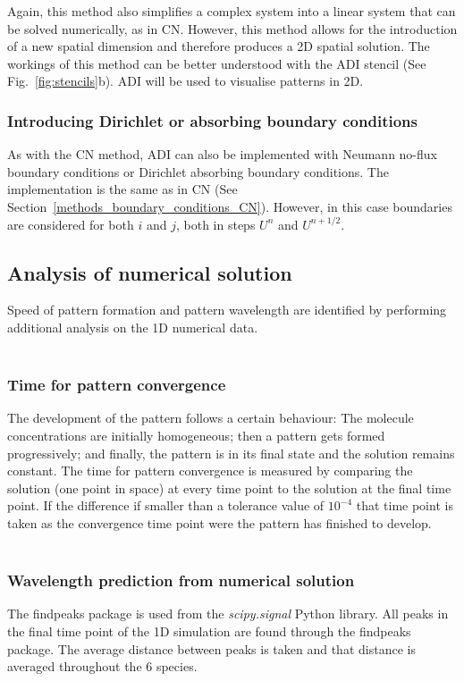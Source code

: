 Again, this method also simplifies a complex system into a linear system that can be solved numerically, as in \acrshort{CN}. However, this method allows for the introduction of a new spatial dimension and therefore produces a 2D spatial solution. The workings of this method can be better understood with the \acrshort{ADI} stencil (See Fig.~\ref{fig:stencils}b). \acrshort{ADI} will be used to visualise patterns in 2D.


\subsubsection{Introducing Dirichlet or absorbing boundary conditions}\label{methods_boundary_conditions_ADI}
As with the CN method, ADI can also be implemented with Neumann no-flux boundary conditions or Dirichlet absorbing boundary conditions.
The implementation is the same as in CN (See Section~\ref{methods_boundary_conditions_CN}).
However, in this case boundaries are considered for both $i$ and $j$, both in steps $U^n$ and $U^{n+1/2}$.

\subsection{Analysis of numerical solution}
Speed of pattern formation and pattern wavelength are identified by performing additional analysis on the 1D numerical data.  \\\\
\subsubsection{Time for pattern convergence}
The development of the pattern follows a certain behaviour: The molecule concentrations are initially homogeneous; then a pattern gets formed progressively; and finally, the pattern is in its final state and the solution remains constant.
The time for pattern convergence is measured by comparing the solution (one point in space) at every time point to the solution at the final time point. If the difference if smaller than a tolerance value of $10^{-4}$ that time point is taken as the convergence time point were the pattern has finished to  develop. \\\\
\subsubsection{Wavelength prediction from numerical solution}
The findpeaks package is used from the \textit{scipy.signal} Python library. All peaks in the final time point of the 1D simulation are found through the findpeaks package. The average distance between peaks is taken and that distance is averaged throughout the 6 species.

